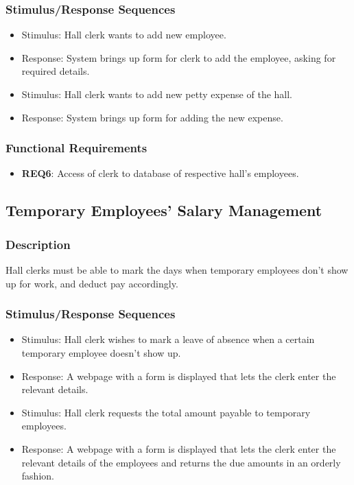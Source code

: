 \documentclass{scrreprt}
\begin{document}
\subsubsection{Stimulus/Response Sequences}
\begin{itemize}
    \item Stimulus: Hall clerk wants to add new employee.
    \item Response: System brings up form for clerk to add the employee, asking for required details.
    \item Stimulus: Hall clerk wants to add new petty expense of the hall.
    \item Response: System brings up form for adding the new expense.
\end{itemize}

\subsubsection{Functional Requirements}
\begin{itemize}
    \item \textbf{REQ6}: Access of clerk to database of respective hall's employees.
\end{itemize}
\subsection{Temporary Employees' Salary Management}
\subsubsection{Description}
Hall clerks must be able to mark the days when temporary employees don't show up for work, and deduct pay accordingly. 
\subsubsection{Stimulus/Response Sequences}
\begin{itemize}
    \item Stimulus: Hall clerk wishes to mark a leave of absence when a certain temporary employee doesn't show up.
    \item Response: A webpage with a form is displayed that lets the clerk enter the relevant details.
\end{itemize}

\begin{itemize}
    \item Stimulus: Hall clerk requests the total amount payable to temporary employees.
    \item Response: A webpage with a form is displayed that lets the clerk enter the relevant details of the employees and returns the due amounts in an orderly fashion.
\end{itemize}
\end{document}
